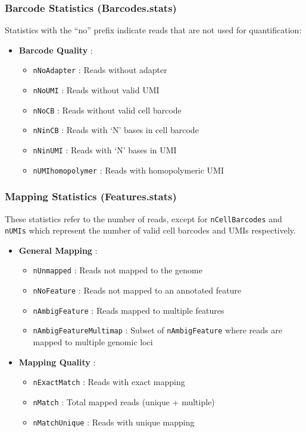 \documentclass[
  11pt,
  a4paper,
]{report}
\providecommand{\tightlist}{%
  \setlength{\itemsep}{0pt}\setlength{\parskip}{0pt}}\usepackage{longtable,booktabs,array}
\begin{document}
\subsubsection{Barcode Statistics
(Barcodes.stats)}\label{barcode-statistics-barcodes.stats}

Statistics with the ``no'' prefix indicate reads that are not used for
quantification:

\begin{itemize}
\tightlist
\item
  \textbf{Barcode Quality} :

  \begin{itemize}
  \tightlist
  \item
    \texttt{nNoAdapter} : Reads without adapter
  \item
    \texttt{nNoUMI} : Reads without valid UMI
  \item
    \texttt{nNoCB} : Reads without valid cell barcode
  \item
    \texttt{nNinCB} : Reads with `N' bases in cell barcode
  \item
    \texttt{nNinUMI} : Reads with `N' bases in UMI
  \item
    \texttt{nUMIhomopolymer} : Reads with homopolymeric UMI
  \end{itemize}
\end{itemize}

\subsubsection{Mapping Statistics
(Features.stats)}\label{mapping-statistics-features.stats}

These statistics refer to the number of reads, except for
\texttt{nCellBarcodes} and \texttt{nUMIs} which represent the number of
valid cell barcodes and UMIs respectively.

\begin{itemize}
\tightlist
\item
  \textbf{General Mapping} :

  \begin{itemize}
  \tightlist
  \item
    \texttt{nUnmapped} : Reads not mapped to the genome
  \item
    \texttt{nNoFeature} : Reads not mapped to an annotated feature
  \item
    \texttt{nAmbigFeature} : Reads mapped to multiple features
  \item
    \texttt{nAmbigFeatureMultimap} : Subset of \texttt{nAmbigFeature}
    where reads are mapped to multiple genomic loci
  \end{itemize}
\item
  \textbf{Mapping Quality} :

  \begin{itemize}
  \tightlist
  \item
    \texttt{nExactMatch} : Reads with exact mapping
  \item
    \texttt{nMatch} : Total mapped reads (unique + multiple)
  \item
    \texttt{nMatchUnique} : Reads with unique mapping
  \end{itemize}
\end{itemize}
\end{document}
